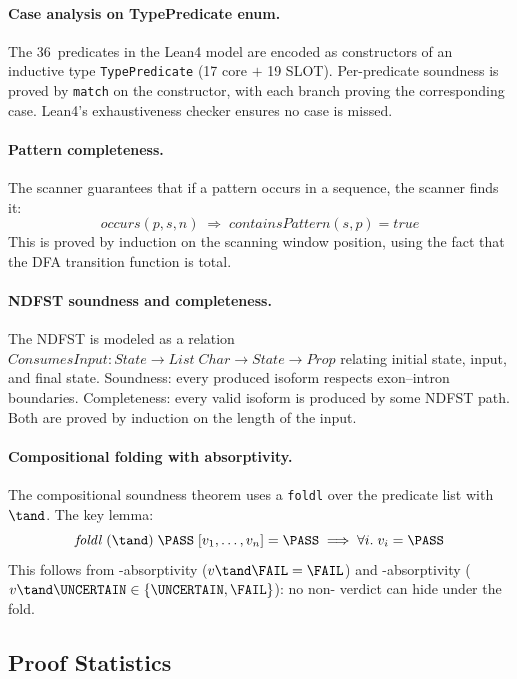 \paragraph{Case analysis on TypePredicate enum.}
The 36~predicates in the Lean4 model are encoded as constructors of an inductive type
\texttt{TypePredicate} (17 core $+$ 19 SLOT).
Per-predicate soundness is proved by \texttt{match} on the constructor,
with each branch proving the corresponding case.
Lean4's exhaustiveness checker ensures no case is missed.

\paragraph{Pattern completeness.}
The scanner guarantees that if a pattern occurs in a sequence, the
scanner finds it:
\[
  \mathit{occurs}(p, s, n) \;\Rightarrow\;
  \mathit{containsPattern}(s, p) = \mathit{true}
\]
This is proved by induction on the scanning window position,
using the fact that the DFA transition function is total.

\paragraph{NDFST soundness and completeness.}
The NDFST is modeled as a relation
$\mathit{ConsumesInput} : \mathit{State} \to \mathit{List}\;\mathit{Char}
 \to \mathit{State} \to \mathit{Prop}$
relating initial state, input, and final state.
Soundness: every produced isoform respects exon--intron boundaries.
Completeness: every valid isoform is produced by some NDFST path.
Both are proved by induction on the length of the input.

\paragraph{Compositional folding with absorptivity.}
The compositional soundness theorem uses a \texttt{foldl} over the
predicate list with $\tand$.
The key lemma:
\[
  \mathit{foldl}\;(\tand)\;\PASS\;[v_1, \ldots, v_n] = \PASS
  \;\Longrightarrow\;
  \forall i.\; v_i = \PASS
\]
This follows from \FAIL-absorptivity ($v \tand \FAIL = \FAIL$) and
\UNCERTAIN-absorptivity ($v \tand \UNCERTAIN \in \{\UNCERTAIN, \FAIL\}$):
no non-\PASS{} verdict can hide under the fold.

\subsection{Proof Statistics}\label{sec:proof-stats}

